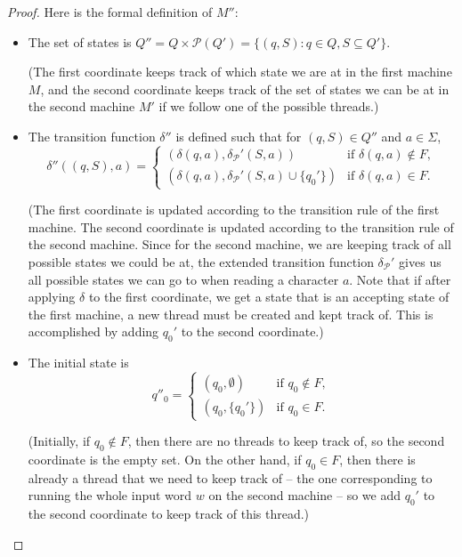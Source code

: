 \begin{flex}
\begin{proof}
Here is the formal definition of $M''$:
\begin{itemize}
    \item The set of states is $Q'' = Q \times \mathcal{P}(Q') = \{(q, S) : q \in Q, S \subseteq Q'\}$.

    (The first coordinate keeps track of which state we are at in the first machine $M$, and the second coordinate keeps track of the set of states we can be at in the second machine $M'$ if we follow one of the possible threads.)

    \item The transition function $\delta''$ is defined such that for $(q,S) \in Q''$ and $a \in \Sigma$, 
        \[ 
        \delta''( (q,S), a) = \begin{cases}
                                (\delta(q, a), \delta_{\mathcal{P}}'(S,a)) & \text{if } \delta(q,a) \not \in F, \\
                                (\delta(q, a), \delta_{\mathcal{P}}'(S,a) \cup \{q_0'\}) & \text{if } \delta(q,a) \in F.
                              \end{cases}
        \]

        (The first coordinate is updated according to the transition rule of the first machine. The second coordinate is updated according to the transition rule of the second machine. Since for the second machine, we are keeping track of all possible states we could be at, the extended transition function $\delta_{\mathcal{P}}'$ gives us all possible states we can go to when reading a character $a$. Note that if after applying $\delta$ to the first coordinate, we get a state that is an accepting state of the first machine, a new thread must be created and kept track of. This is accomplished by adding $q_0'$ to the second coordinate.)

    \item The initial state is 
        \[
        q''_0 = \begin{cases}
                    (q_0, \emptyset) & \text{if } q_0 \not \in F, \\
                    (q_0, \{q_0'\}) & \text{if } q_0 \in F.
                \end{cases}
        \]

        (Initially, if $q_0 \not \in F$, then there are no threads to keep track of, so the second coordinate is the empty set. On the other hand, if $q_0 \in F$, then there is already a thread that we need to keep track of -- the one corresponding to running the whole input word $w$ on the second machine -- so we add $q_0'$ to the second coordinate to keep track of this thread.)


\end{itemize}
\end{proof}
\end{flex}
